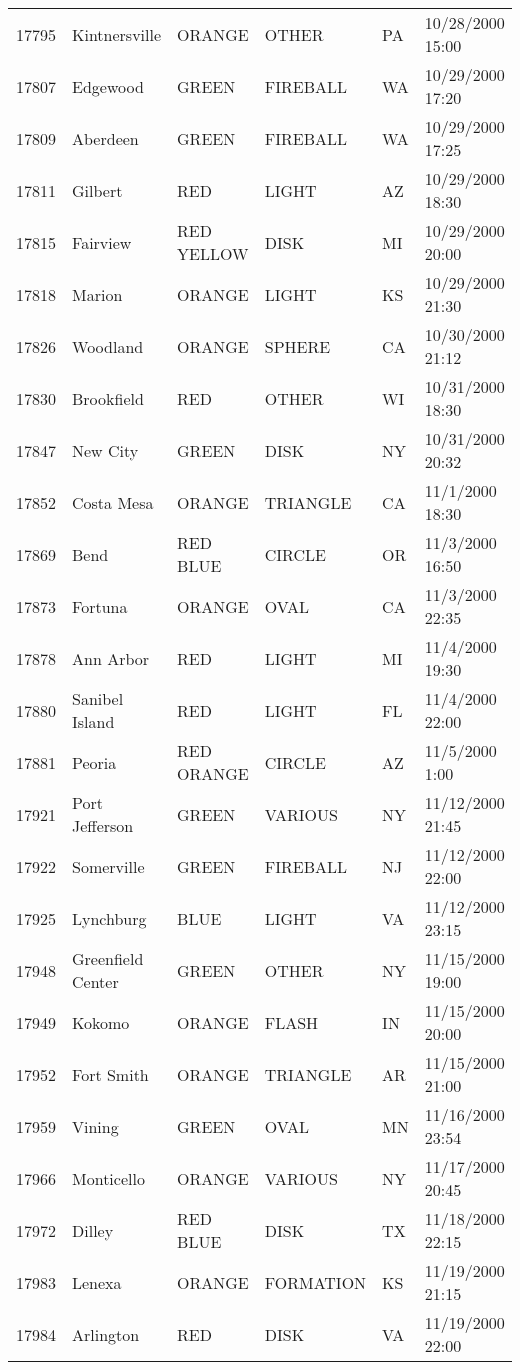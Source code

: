 \begin{tabular}{llllll}
17795 & Kintnersville & ORANGE & OTHER & PA & 10/28/2000 15:00 \\
17807 & Edgewood & GREEN & FIREBALL & WA & 10/29/2000 17:20 \\
17809 & Aberdeen & GREEN & FIREBALL & WA & 10/29/2000 17:25 \\
17811 & Gilbert & RED & LIGHT & AZ & 10/29/2000 18:30 \\
17815 & Fairview & RED YELLOW & DISK & MI & 10/29/2000 20:00 \\
17818 & Marion & ORANGE & LIGHT & KS & 10/29/2000 21:30 \\
17826 & Woodland & ORANGE & SPHERE & CA & 10/30/2000 21:12 \\
17830 & Brookfield & RED & OTHER & WI & 10/31/2000 18:30 \\
17847 & New City & GREEN & DISK & NY & 10/31/2000 20:32 \\
17852 & Costa Mesa & ORANGE & TRIANGLE & CA & 11/1/2000 18:30 \\
17869 & Bend & RED BLUE & CIRCLE & OR & 11/3/2000 16:50 \\
17873 & Fortuna & ORANGE & OVAL & CA & 11/3/2000 22:35 \\
17878 & Ann Arbor & RED & LIGHT & MI & 11/4/2000 19:30 \\
17880 & Sanibel Island & RED & LIGHT & FL & 11/4/2000 22:00 \\
17881 & Peoria & RED ORANGE & CIRCLE & AZ & 11/5/2000 1:00 \\
17921 & Port Jefferson & GREEN & VARIOUS & NY & 11/12/2000 21:45 \\
17922 & Somerville & GREEN & FIREBALL & NJ & 11/12/2000 22:00 \\
17925 & Lynchburg & BLUE & LIGHT & VA & 11/12/2000 23:15 \\
17948 & Greenfield Center & GREEN & OTHER & NY & 11/15/2000 19:00 \\
17949 & Kokomo & ORANGE & FLASH & IN & 11/15/2000 20:00 \\
17952 & Fort Smith & ORANGE & TRIANGLE & AR & 11/15/2000 21:00 \\
17959 & Vining & GREEN & OVAL & MN & 11/16/2000 23:54 \\
17966 & Monticello & ORANGE & VARIOUS & NY & 11/17/2000 20:45 \\
17972 & Dilley & RED BLUE & DISK & TX & 11/18/2000 22:15 \\
17983 & Lenexa & ORANGE & FORMATION & KS & 11/19/2000 21:15 \\
17984 & Arlington & RED & DISK & VA & 11/19/2000 22:00 \\

\end{tabular}
